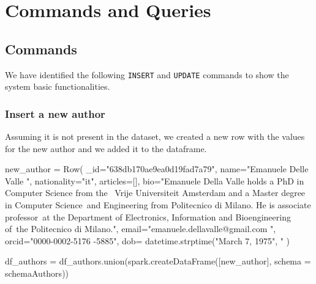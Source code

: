 \documentclass{Configuration_Files/PoliMi3i_thesis}
\begin{document}
\chapter{Commands and Queries}
\label{ch:ceq}
\section{Commands}
We have identified the following \verb |INSERT| and \verb |UPDATE| commands to show the system basic functionalities.

\subsection{Insert a new author}
\label{auth_insert}
Assuming it is not present in the dataset, we created a new row with the values for the new author and we added it to the
dataframe.\newline
\begin{python}
new_author = Row(
    _id="638db170ae9ea0d19fad7a79",
    name="Emanuele Delle Valle ",
    nationality="it",
    articles=[],
    bio="Emanuele Della Valle holds a PhD in Computer Science from the \
        Vrije Universiteit Amsterdam and a Master degree in Computer Science\
        and Engineering from Politecnico di Milano. He is associate professor\
        at the Department of Electronics, Information and Bioengineering of\
        the Politecnico di Milano.",
    email="emanuele.dellavalle@gmail.com ",
    orcid="0000-0002-5176 -5885",
    dob= datetime.strptime("March 7, 1975", "%
)

df_authors = df_authors.union(spark.createDataFrame([new_author], schema = schemaAuthors))
\end{python}
\end{document}
